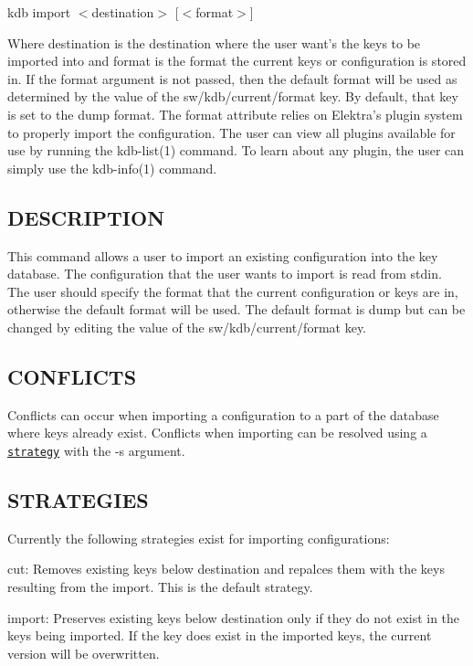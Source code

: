{\ttfamily kdb import $<$destination$>$ \mbox{[}$<$format$>$\mbox{]}}

Where {\ttfamily destination} is the destination where the user want's the keys to be imported into and {\ttfamily format} is the format the current keys or configuration is stored in. If the {\ttfamily format} argument is not passed, then the default format will be used as determined by the value of the {\ttfamily sw/kdb/current/format} key. By default, that key is set to the {\ttfamily dump} format. The {\ttfamily format} attribute relies on Elektra's plugin system to properly import the configuration. The user can view all plugins available for use by running the kdb-\/list(1) command. To learn about any plugin, the user can simply use the kdb-\/info(1) command.

\subsection*{D\+E\+S\+C\+R\+I\+P\+T\+I\+O\+N}

This command allows a user to import an existing configuration into the key database. The configuration that the user wants to import is read from {\ttfamily stdin}. The user should specify the format that the current configuration or keys are in, otherwise the default format will be used. The default format is {\ttfamily dump} but can be changed by editing the value of the {\ttfamily sw/kdb/current/format} key.

\subsection*{C\+O\+N\+F\+L\+I\+C\+T\+S}

Conflicts can occur when importing a configuration to a part of the database where keys already exist. Conflicts when importing can be resolved using a \href{#STRATEGIES}{\tt strategy} with the {\ttfamily -\/s} argument.

\subsection*{S\+T\+R\+A\+T\+E\+G\+I\+E\+S}

Currently the following strategies exist for importing configurations\+:


\begin{DoxyItemize}
\item {\ttfamily cut}\+: Removes existing keys below {\ttfamily destination} and repalces them with the keys resulting from the import. This is the default strategy.
\item {\ttfamily import}\+: Preserves existing keys below {\ttfamily destination} only if they do not exist in the keys being imported. If the key does exist in the imported keys, the current version will be overwritten.
\end{DoxyItemize}

